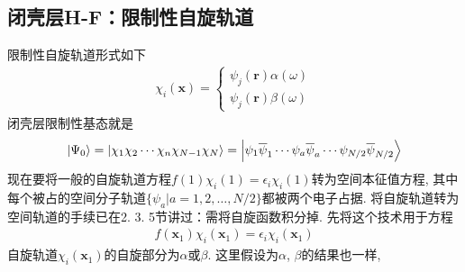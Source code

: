 \subsection{闭壳层H-F：限制性自旋轨道}\label{sec3.4.1}
限制性自旋轨道形式如下
\begin{align}\label{3.110}
	\chi_i(\mathbf{x}) =
	\begin{cases*}
		\psi_j(\mathbf{r})\alpha(\omega)\\
		\psi_j(\mathbf{r})\beta(\omega)
	\end{cases*}
\end{align}
闭壳层限制性基态就是
\begin{align}\label{3.111}
	\Ket{\Psi_0} = \Ket{\chi_1\chi_2\cdots\chi_n\chi_{N-1}\chi_N} = \Ket{\psi_1\overline{\psi}_1\cdots\psi_a\overline{\psi}_a\cdots\psi_{N/2}\overline{\psi}_{N/2}}
\end{align}
现在要将一般的自旋轨道\hft 方程$f(1)\chi_i(1)=\epsilon_i\chi_i(1)$转为空间本征值方程, 
其中每个被占的空间分子轨道$\{\psi_a|a=1,2,\ldots,N/2\}$都被两个电子占据. 
将自旋轨道转为空间轨道的手续已在2.
3.
5节讲过：需将自旋函数积分掉. 
先将这个技术用于\hft 方程
\begin{align}\label{3.112}
	f(\mathbf{x}_1)\chi_i(\mathbf{x}_1) = \epsilon_i\chi_i(\mathbf{x}_1)
\end{align}
自旋轨道$\chi_i(\mathbf{x}_1)$的自旋部分为$\alpha$或$\beta$. 
这里假设为$\alpha$, 
$\beta$的结果也一样,

